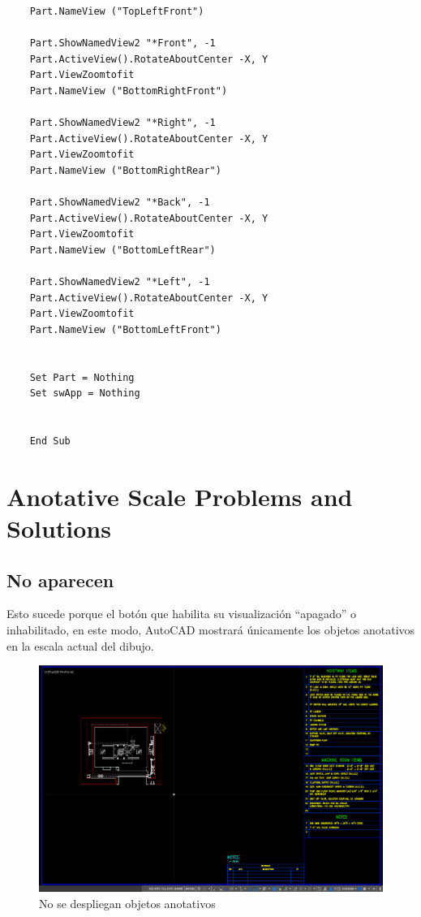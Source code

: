 \documentclass[12pt,letterpaper,final]{report}
\begin{document}
\begin{lstlisting}
	Part.NameView ("TopLeftFront")
	
	Part.ShowNamedView2 "*Front", -1
	Part.ActiveView().RotateAboutCenter -X, Y
	Part.ViewZoomtofit
	Part.NameView ("BottomRightFront")
	
	Part.ShowNamedView2 "*Right", -1
	Part.ActiveView().RotateAboutCenter -X, Y
	Part.ViewZoomtofit
	Part.NameView ("BottomRightRear")
	
	Part.ShowNamedView2 "*Back", -1
	Part.ActiveView().RotateAboutCenter -X, Y
	Part.ViewZoomtofit
	Part.NameView ("BottomLeftRear")
	
	Part.ShowNamedView2 "*Left", -1
	Part.ActiveView().RotateAboutCenter -X, Y
	Part.ViewZoomtofit
	Part.NameView ("BottomLeftFront")
	
	
	Set Part = Nothing
	Set swApp = Nothing
	
	
	End Sub
\end{lstlisting}

\chapter{Anotative Scale Problems and Solutions}

\section{No aparecen}

Esto sucede porque el botón que habilita su visualización “apagado” o inhabilitado, en este modo, AutoCAD mostrará únicamente los objetos anotativos en la escala actual del dibujo.

\begin{figure}[H]
	\centering
	\includegraphics[width=0.85\linewidth, height=0.5\textheight,keepaspectratio]{Imagenes/apendice_anotative_01}
	\caption{No se despliegan objetos anotativos}
	\label{fig:apendiceanotative01}
\end{figure}
\end{document}
